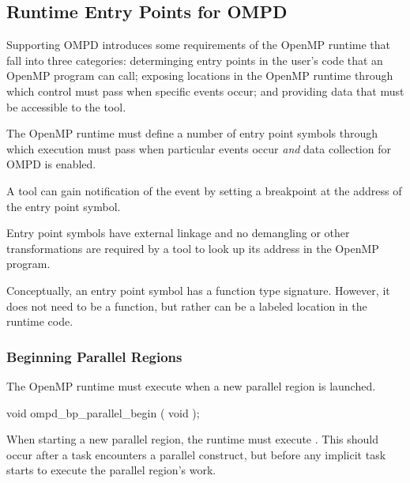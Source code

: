 \subsection{Runtime Entry Points for OMPD}
\label{subsec:runtime-entry-points-for-ompd}

Supporting OMPD introduces some requirements of the OpenMP 
runtime
that
fall into three categories: determinging entry points in the user's code that
an OpenMP program can call; exposing locations in the OpenMP runtime through
which control must pass when specific events occur; and providing data that must
be accessible to the tool.


The OpenMP runtime must define a number of entry point symbols
through which execution must pass when particular events occur
\emph{and} data collection for OMPD is enabled.

A tool can gain notification of the event by setting 
a breakpoint at the address of the entry point symbol.

\restrictions

Entry point symbols have external  linkage and no
demangling or other transformations are required by a tool
to look up its address in the OpenMP program.

Conceptually, an entry point symbol has a function type signature.
However, it does not need to be a function, but rather can be a labeled location
in the runtime code.




\subsubsection{Beginning Parallel Regions}
\label{subsubsec:ompd_bp_parallel_begin}

\summary
The OpenMP runtime must execute 
 when a new parallel region is launched.

\format
\begin{cspecific}
\begin{ompSyntax}
void ompd_bp_parallel_begin ( void );
\end{ompSyntax}
\end{cspecific}


\descr

When starting a new parallel region, the runtime must 
execute .
This should occur after a task encounters a parallel construct,
but before any implicit task starts to execute the parallel
region's work.


